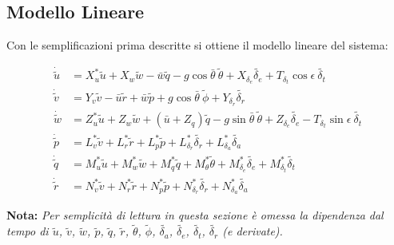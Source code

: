 \subsection{Modello Lineare}
Con le semplificazioni prima descritte si ottiene il modello lineare del sistema:

\begin{equation}
    \label{eq:modelloLineare}
    \begin{split}
        \dot{\widetilde{u}} & = X_u^* \widetilde{u} + X_w\widetilde{w} -\bar{w}\widetilde{q} -g\cos\bar{\theta}\:\widetilde{\theta} + X_{\delta_e}\widetilde{\delta_e} + T_{\delta_t}\cos\epsilon\:\widetilde{\delta_t}           \\
        \dot{\widetilde{v}} & = Y_v\widetilde{v} - \bar{u}\widetilde{r} + \bar{w}\widetilde{p} + g\cos\bar{\theta}\:\widetilde{\phi} + Y_{\delta_r}\widetilde{\delta_r}                                                           \\
        \dot{\widetilde{w}} & = Z_u^* \widetilde{u} + Z_w\widetilde{w} + (\bar{u} + Z_q)\widetilde{q} - g\sin\bar{\theta}\:\widetilde{\theta} + Z_{\delta_e}\widetilde{\delta_e} - T_{\delta_t}\sin\epsilon\:\widetilde{\delta_t} \\
        \dot{\widetilde{p}} & = L_v^*\widetilde{v} + L_r^*\widetilde{r} + L_p^*\widetilde{p} + L_{\delta_r}^*\widetilde{\delta_r }+ L_{\delta_a}^*\widetilde{\delta_a}                                                            \\
        \dot{\widetilde{q}} & = M_u^*\widetilde{u} + M_w^*\widetilde{w} + M_q^*\widetilde{q} + M_{\theta}^*\widetilde{\theta} + M_{\delta_e}^*\widetilde{\delta_e} + M_{\delta_t}^*\widetilde{\delta_t}                           \\
        \dot{\widetilde{r}} & = N_v^*\widetilde{v} + N_r^*\widetilde{r} + N_p^*\widetilde{p} + N_{\delta_r}^*\widetilde{\delta_r }+ N_{\delta_a}^*\widetilde{\delta_a}
    \end{split}
\end{equation}

\textbf{Nota:} \textit{Per semplicità di lettura in questa sezione è omessa la dipendenza dal tempo di $\widetilde{u}$, $\widetilde{v}$, $\widetilde{w}$, $\widetilde{p}$, $\widetilde{q}$, $\widetilde{r}$, $\widetilde{\theta}$, $\widetilde{\phi}$, $\widetilde{\delta_a}$, $\widetilde{\delta_e}$, $\widetilde{\delta_t}$, $\widetilde{\delta_r}$ (e derivate).}

